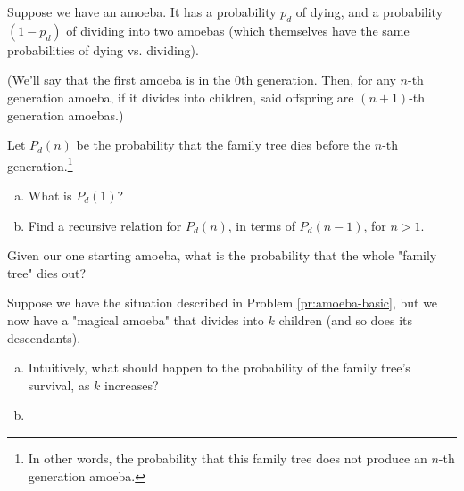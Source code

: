 \begin{problem}
\label{pr:amoeba-2}
Suppose we have an amoeba. It has a probability $p_d$ of dying, and a probability $(1 - p_d)$ of dividing into two amoebas (which themselves have the same probabilities of dying vs. dividing). 

(We'll say that the first amoeba is in the 0th generation. Then, for any $n$-th generation amoeba, if it divides into children, said offspring are $(n+1)$-th generation amoebas.) 

Let $P_d(n)$ be the probability that the family tree dies before the $n$-th generation.\footnote{In other words, the probability that this family tree does not produce an $n$-th generation amoeba.}


\begin{enumerate}[(a)]
\item What is $P_d(1)$?
\item Find a recursive relation for $P_d(n)$, in terms of $P_d(n-1)$, for $n > 1$. 
\end{enumerate}
\hfill

Given our one starting amoeba, what is the probability that the whole "family tree" dies out?
\end{problem}



\begin{problem}
\label{pr:amoeba-nstart}
\end{problem}

\begin{problem}
\label{pr:amoeba-kdesc}
Suppose we have the situation described in Problem \ref{pr:amoeba-basic}, but we now have a "magical amoeba" that divides into $k$ children (and so does its descendants). 

\begin{enumerate}[(a)]
\item Intuitively, what should happen to the probability of the family tree's survival, as $k$ increases?
\item 
\end{enumerate}
\end{problem}

